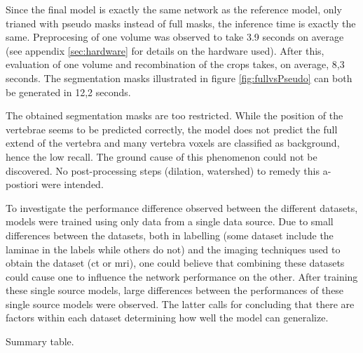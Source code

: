 \par{
    Since the final model is exactly the same network as the reference model, only trianed with pseudo masks instead of full masks, the inference time is exactly the same.
Preprocesing of one volume was observed to take 3.9 seconds on average (see appendix \ref{sec:hardware} for details on the hardware used).
After this, evaluation of one volume and recombination of the crops takes, on average, 8,3 seconds.
The segmentation masks illustrated in figure \ref{fig:fullvsPseudo} can both be generated in 12,2 seconds.
}
\par{
    The obtained segmentation masks are too restricted.
    While the position of the vertebrae seems to be predicted correctly, the model does not predict the full extend of the vertebra and many vertebra voxels are classified as background, hence the low recall.
    The ground cause of this phenomenon could not be discovered.
    No post-processing steps (dilation, watershed) to remedy this a-postiori were intended. 
}

\par{
    To investigate the performance difference observed between the different datasets, models were trained using only data from a single data source.
    Due to small differences between the datasets, both in labelling (some dataset include the laminae in the labels while others do not) and the imaging techniques used to obtain the dataset (\acrshort{ct} or \acrshort{mri}),
    one could believe that combining these datasets could cause one to influence the network performance on the other.
    After training these single source models, large differences between the performances of these single source models were observed.
    The latter calls for concluding that there are factors within each dataset determining how well the model can generalize.
}

\begin{table}

    
    \caption{Summary table.
    }

\end{table}

